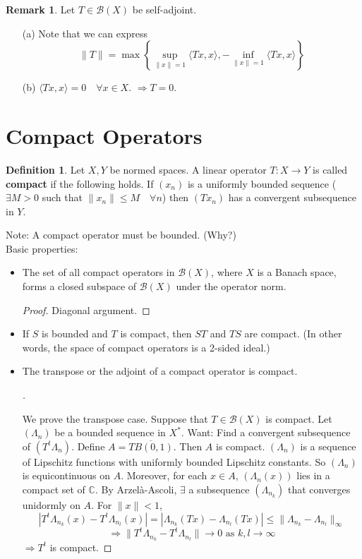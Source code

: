 \documentclass{article}
\theoremstyle{definition}
\newtheorem{dfn}{Definition}
\newtheorem{rem}{Remark}
\newenvironment{proofs}[1][\proofname]{%
  \begin{proof}[#1]$ $\par\nobreak\ignorespaces
}{%
  \end{proof}
}
\newcommand{\B}{\mathcal B}
\newcommand{\CC}{\mathbb C}
\begin{document}
\begin{rem}
	Let $T \in \B(X)$ be self-adjoint.
	\begin{enumerate}
		\item[(a)] Note that we can express
			\[
				\|T\| = \max \left\{ \sup_{\|x\| = 1} \langle T x, x \rangle, - \inf_{\|x\| = 1} \langle T x, x \rangle \right\}
			\]
			
		\item[(b)] $\langle T x, x \rangle = 0 \quad \forall x \in X$.
			$\Rightarrow T = 0$.

	\end{enumerate}
\end{rem}

\section{Compact Operators}

\begin{dfn}
	Let $X, Y$ be normed spaces.
	A linear operator $T: X \to Y$ is called \textbf{compact} if the following holds.
	If $(x_n)$ is a uniformly bounded sequence ($\exists M > 0$ such that $\|x_n\| \leq M \quad \forall n$) then $(T x_n)$ has a convergent subsequence in $Y$.
\end{dfn}

Note: A compact operator must be bounded. (Why?)\\
Basic properties:
\begin{itemize}
	\item The set of all compact operators in $\B(X)$, where $X$ is a Banach space, forms a closed subspace of $\B(X)$ under the operator norm.
		\begin{proof}
			Diagonal argument.
		\end{proof}

	\item If $S$ is bounded and $T$ is compact, then $ST$ and $TS$ are compact.
		(In other words, the space of compact operators is a 2-sided ideal.)

	\item The transpose or the adjoint of a compact operator is compact.
		\begin{proofs}
			We prove the transpose case.
			Suppose that $T \in \B(X)$ is compact.
			Let $(\Lambda_n)$ be a bounded sequence in $X^*$.
			Want: Find a convergent subsequence of $(T^t \Lambda_n)$.
			Define $A = \overline{T B(0, 1)}$.
			Then $A$ is compact.
			$(\Lambda_n)$ is a sequence of Lipschitz functions with uniformly bounded Lipschitz constants.
			So $(\Lambda_n)$ is equicontinuous on $A$.
			Moreover, for each $x \in A$, $(\Lambda_n(x))$ lies in a compact set of $\CC$.
			By Arzel\`a-Ascoli, $\exists$ a subsequence $(\Lambda_{n_k})$ that converges unidormly on $A$.
			For $\|x\| < 1$, 
			\[
				| T^t \Lambda_{n_k} (x) - T^t \Lambda_{n_l}(x)| = |\Lambda_{n_k} (T x) - \Lambda_{n_l} (T x)| \leq \|\Lambda_{n_k} - \Lambda_{n_l}\|_\infty
			\]
			\[
				\Rightarrow \|T^t \Lambda_{n_k} - T^t \Lambda_{n_l}\| \to 0 \text{ as }k, l \to \infty
			\]
			$\Rightarrow T^t$ is compact.
		\end{proofs}
\end{itemize}
\end{document}

